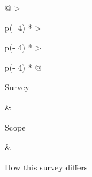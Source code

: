 \begin{table}[!t]
\caption{Neighboring surveys and where this one departs from each. This survey classifies by loop closure, gate type, signal class, and governance, and is the only one to cover promotion across organizations.}\label{tab:II-2}
\centering\small
\begin{tabular}{@{}
  >{\raggedright\arraybackslash}p{(\textwidth - 4\tabcolsep) * }
  >{\raggedright\arraybackslash}p{(\textwidth - 4\tabcolsep) * }
  >{\raggedright\arraybackslash}p{(\textwidth - 4\tabcolsep) * }@{}}
\toprule\noalign{}
\begin{minipage}[b]{\linewidth}\raggedright
Survey
\end{minipage} & \begin{minipage}[b]{\linewidth}\raggedright
Scope
\end{minipage} & \begin{minipage}[b]{\linewidth}\raggedright
How this survey differs
\end{minipage} \\
\midrule\noalign{}



\end{tabular}
\end{table}
